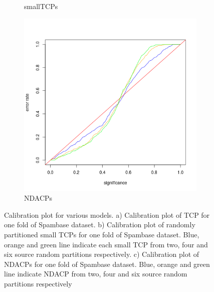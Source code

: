 \documentclass[main]{subfiles}
\begin{document}
\begin{figure}[H]
\begin{center}
\begin{subfigure}{.3\textwidth}
  \caption{smallTCPs}\label{fig:valIndividual}
  \end{subfigure}
  \begin{subfigure}{.3\textwidth}
  \centering
  \includegraphics[scale=0.2]{images/eqSourceCombined}
  \caption{NDACPs}\label{fig:valCombined}
  \end{subfigure}
  
 \caption{Calibration plot for various models. a) Calibration plot of TCP for one fold of Spambase dataset. b) Calibration plot of randomly partitioned small TCPs for one fold of  Spambase dataset. Blue, orange and  green line indicate each small TCP from two, four and six source random partitions respectively. c) Calibration plot of NDACPs for one fold of Spambase dataset. Blue, orange and  green line indicate NDACP from two, four and six source random partitions respectively}
 
\end{center}
\end{figure}


\end{document}
